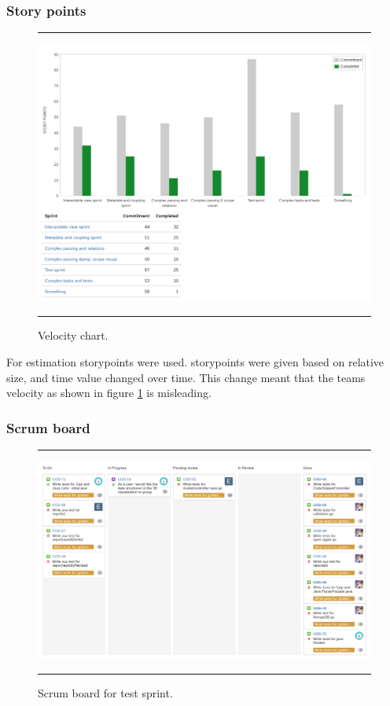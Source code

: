 \subsubsection{Story points}

\begin{figure}[H]
    \noindent\rule{\textwidth}{1pt}    
    \includegraphics[width=\textwidth]{inc/images/velocity.png}
    \noindent\rule{\textwidth}{1pt}
    \caption{Velocity chart.}
    \label{fig:velocityChart}
\end{figure}

For estimation \glspl{storypoint} were used. \Glspl{storypoint} were given based on relative size, and time value changed over time. This change meant that the teams velocity as shown in figure \ref{fig:velocityChart} is misleading.

\subsubsection{Scrum board}
\begin{figure}[H]
    \noindent\rule{\textwidth}{1pt}    
    \includegraphics[width=\textwidth]{inc/images/board.png}
    \noindent\rule{\textwidth}{1pt}
    \caption{Scrum board for test sprint.}
    \label{fig:scrumBoar}
\end{figure}

